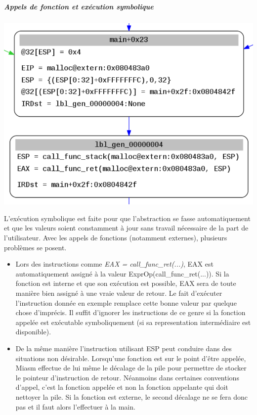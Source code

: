 \subparagraph{Appels de fonction et exécution symbolique}
\begin{center}
\includegraphics[scale=0.3]{ir.png}\newline
\end{center}
L'exécution symbolique est faite pour que l'abstraction se fasse automatiquement et que les valeurs soient constamment à jour sans travail nécessaire de la part de l'utilisateur. Avec les appels de
fonctions (notamment externes), plusieurs problèmes se posent.
\begin{itemize}
    \item Lors des instructions comme \textit{EAX = call\_func\_ret(...)}, EAX est automatiquement assigné à la valeur ExprOp(call\_func\_ret(...)). Si la fonction est interne et que
    son exécution est possible, EAX sera de toute manière bien assigné à une vraie valeur de retour. Le fait d'exécuter l'instruction donnée en exemple remplace cette bonne valeur par quelque
    chose d'imprécis.\newline
    Il suffit d'ignorer les instructions de ce genre si la fonction appelée est exécutable symboliquement (si sa representation intermédiaire est disponible).
    \item De la même manière l'instruction utilisant ESP peut conduire dans des situations non désirable. Lorsqu'une fonction est sur le point d'être appelée, Miasm effectue de lui même le décalage de la pile pour permettre de stocker le pointeur d'instruction de retour.\newline
    Néanmoins dans certaines conventions d'appel, c'est la fonction appelée et non la fonction appelante qui doit nettoyer la pile. Si la fonction est externe, le second décalage ne se fera donc pas et il faut alors l'effectuer à la main.
\end{itemize}

